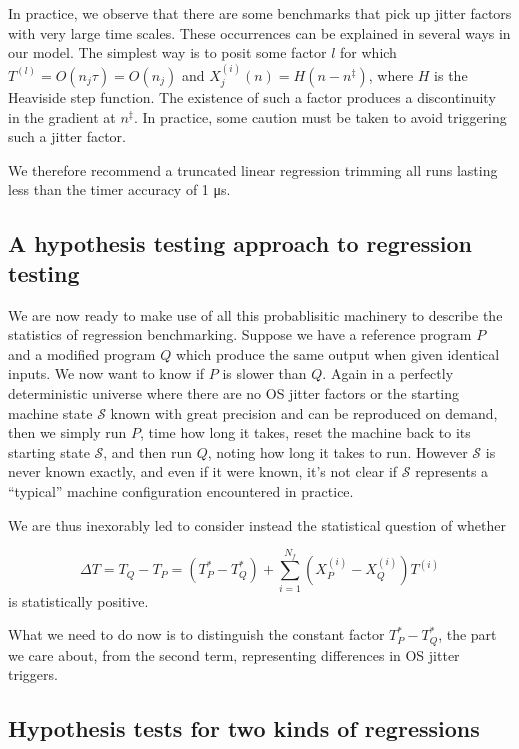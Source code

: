 \documentclass[conference]{IEEEtran}
\begin{document}
In practice, we observe that there are some benchmarks that pick up jitter factors with very large time scales. These occurrences can be explained in several ways in our model. The simplest way is to posit some factor $l$ for which $T^{(l)} = O(n_j \tau) = O(n_j)$ and $X_j^{(i)}(n) = H(n - n^\ddagger)$,
where $H$ is the Heaviside step function. The existence of such a factor produces a discontinuity in the gradient at $n^\ddagger$. In practice, some caution must be taken to avoid triggering such a jitter factor.

We therefore recommend a truncated linear regression trimming all runs lasting less than the timer accuracy of 1 μs.


\subsection{A hypothesis testing approach to regression testing}

We are now ready to make use of all this probablisitic machinery to describe the statistics of regression benchmarking. Suppose we have a reference program $P$ and a modified program $Q$ which produce the same output when given identical inputs. We now want to know if $P$ is slower than $Q$. Again in a perfectly deterministic universe where there are no OS jitter factors or the starting machine state $\mathcal S$ known with great precision and can be reproduced on demand, then we simply run $P$, time how long it takes, reset the machine back to its starting state $\mathcal S$, and then run $Q$, noting how long it takes to run. However $\mathcal S$ is never known exactly, and even if it were known, it's not clear if
$\mathcal S$ represents a ``typical'' machine configuration encountered in practice.

We are thus inexorably led to consider instead the statistical question of whether

\begin{equation}
\Delta T = T_Q - T_P
= (T^*_P - T^*_Q) + \sum_{i=1}^{N_f} (X^{(i)}_P - X^{(i)}_Q) T^{(i)}
\end{equation}
%
is statistically positive.

What we need to do now is to distinguish the constant factor $T^*_P - T^*_Q$, the part we care about, from the second term, representing differences in OS jitter triggers.


\subsection{Hypothesis tests for two kinds of regressions}
\end{document}
